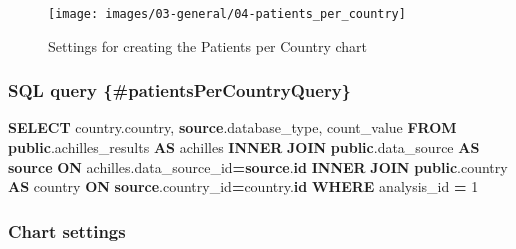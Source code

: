 \documentclass[
]{book}
\newenvironment{Shaded}{\begin{snugshade}}{\end{snugshade}}
\newcommand{\DecValTok}[1]{\textcolor[rgb]{0.00,0.00,0.81}{#1}}
\newcommand{\KeywordTok}[1]{\textcolor[rgb]{0.13,0.29,0.53}{\textbf{#1}}}
\newcommand{\NormalTok}[1]{#1}
\newcommand{\OperatorTok}[1]{\textcolor[rgb]{0.81,0.36,0.00}{\textbf{#1}}}
\begin{document}
\begin{figure}
\texttt{[image: images/03-general/04-patients\_per\_country]} \caption{Settings for creating the Patients per Country chart}\label{fig:patientsPerCountry}
\end{figure}

\hypertarget{sql-query-patientspercountryquery}{%
\subsubsection*{SQL query \{\#patientsPerCountryQuery\}}\label{sql-query-patientspercountryquery}}

\begin{Shaded}
\begin{Highlighting}[]
\KeywordTok{SELECT}\NormalTok{ country.country,}
       \KeywordTok{source}\NormalTok{.database\_type,}
\NormalTok{       count\_value}
\KeywordTok{FROM} \KeywordTok{public}\NormalTok{.achilles\_results }\KeywordTok{AS}\NormalTok{ achilles }
\KeywordTok{INNER} \KeywordTok{JOIN} \KeywordTok{public}\NormalTok{.data\_source }\KeywordTok{AS} \KeywordTok{source} \KeywordTok{ON}\NormalTok{ achilles.data\_source\_id}\OperatorTok{=}\KeywordTok{source}\NormalTok{.}\KeywordTok{id}
\KeywordTok{INNER} \KeywordTok{JOIN} \KeywordTok{public}\NormalTok{.country }\KeywordTok{AS}\NormalTok{ country }\KeywordTok{ON} \KeywordTok{source}\NormalTok{.country\_id}\OperatorTok{=}\NormalTok{country.}\KeywordTok{id}
\KeywordTok{WHERE}\NormalTok{ analysis\_id }\OperatorTok{=} \DecValTok{1}
\end{Highlighting}
\end{Shaded}

\hypertarget{chart-settings-12}{%
\subsubsection*{Chart settings}\label{chart-settings-12}}
\end{document}
